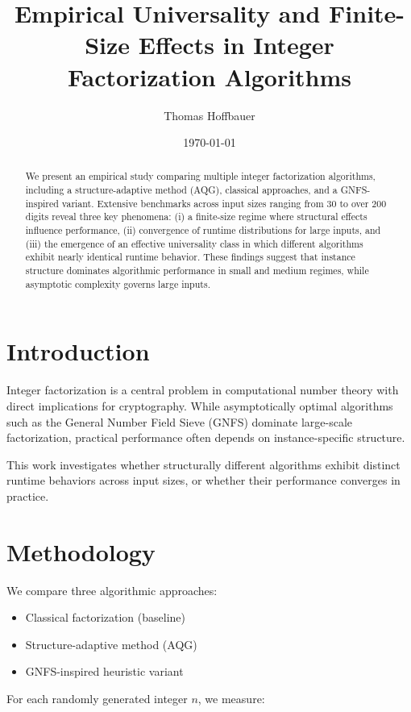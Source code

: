 \documentclass[11pt,a4paper]{article}
\title{Empirical Universality and Finite-Size Effects in Integer Factorization Algorithms}
\author{Thomas Hoffbauer}
\date{\today}
\begin{document}
	
	\maketitle
	
	\begin{abstract}
		We present an empirical study comparing multiple integer factorization algorithms, including a structure-adaptive method (AQG), classical approaches, and a GNFS-inspired variant. Extensive benchmarks across input sizes ranging from 30 to over 200 digits reveal three key phenomena: (i) a finite-size regime where structural effects influence performance, (ii) convergence of runtime distributions for large inputs, and (iii) the emergence of an effective universality class in which different algorithms exhibit nearly identical runtime behavior. These findings suggest that instance structure dominates algorithmic performance in small and medium regimes, while asymptotic complexity governs large inputs.
	\end{abstract}
	
	\section{Introduction}
	
	Integer factorization is a central problem in computational number theory with direct implications for cryptography. While asymptotically optimal algorithms such as the General Number Field Sieve (GNFS) dominate large-scale factorization, practical performance often depends on instance-specific structure.
	
	This work investigates whether structurally different algorithms exhibit distinct runtime behaviors across input sizes, or whether their performance converges in practice.
	
	\section{Methodology}
	
	We compare three algorithmic approaches:
	
	\begin{itemize}
		\item Classical factorization (baseline)
		\item Structure-adaptive method (AQG)
		\item GNFS-inspired heuristic variant
	\end{itemize}
	
	For each randomly generated integer $n$, we measure:
	
\end{document}
